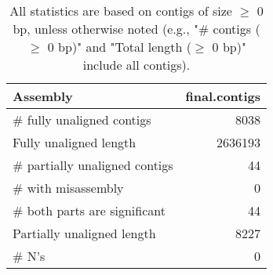 \documentclass[12pt,a4paper]{article}
\begin{document}
\begin{table}[ht]
\begin{center}
\caption{All statistics are based on contigs of size $\geq$ 0 bp, unless otherwise noted (e.g., "\# contigs ($\geq$ 0 bp)" and "Total length ($\geq$ 0 bp)" include all contigs).}
\begin{tabular}{|l*{1}{|r}|}
\hline
Assembly & final.contigs \\ \hline
\# fully unaligned contigs & 8038 \\ \hline
Fully unaligned length & 2636193 \\ \hline
\# partially unaligned contigs & 44 \\ \hline
\hspace{5mm}\# with misassembly & 0 \\ \hline
\hspace{5mm}\# both parts are significant & 44 \\ \hline
Partially unaligned length & 8227 \\ \hline
\# N's & 0 \\ \hline
\end{tabular}
\end{center}
\end{table}
\end{document}
